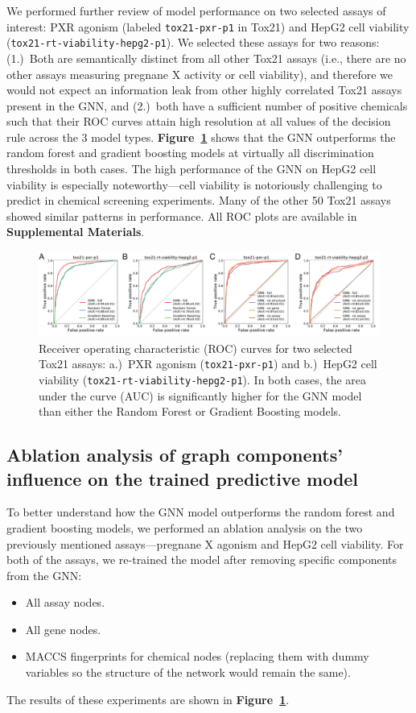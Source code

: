 \documentclass{ws-procs11x85}
\begin{document}
We performed further review of model performance on two selected assays of interest: PXR agonism (labeled \texttt{tox21-pxr-p1} in Tox21) and HepG2 cell viability (\texttt{tox21-rt-viability-hepg2-p1}).
We selected these assays for two reasons: (1.)~Both are semantically distinct from all other Tox21 assays (i.e., there are no other assays measuring pregnane X activity or cell viability), and therefore we would not expect an information leak from other highly correlated Tox21 assays present in the GNN, and (2.)~both have a sufficient number of positive chemicals such that their ROC curves attain high resolution at all values of the decision rule across the 3 model types.
\textbf{Figure~\ref{fig:4}} shows that the GNN outperforms the random forest and gradient boosting models at virtually all discrimination thresholds in both cases. 
The high performance of the GNN on HepG2 cell viability is especially noteworthy---cell viability is notoriously challenging to predict in chemical screening experiments.
Many of the other 50 Tox21 assays showed similar patterns in performance.
All ROC plots are available in \textbf{Supplemental Materials}.

\begin{figure}
   \centering
   \includegraphics[width=\textwidth]{figures/figure3.pdf}
   \caption{Receiver operating characteristic (ROC) curves for two selected Tox21 assays: a.)~PXR agonism (\texttt{tox21-pxr-p1}) and b.)~HepG2 cell viability (\texttt{tox21-rt-viability-hepg2-p1}). In both cases, the area under the curve (AUC) is significantly higher for the GNN model than either the Random Forest or Gradient Boosting models.}\label{fig:4}
\end{figure}

\subsection{Ablation analysis of graph components' influence on the trained predictive model}
To better understand how the GNN model outperforms the random forest and gradient boosting models, we performed an ablation analysis on the two previously mentioned assays---pregnane X agonism and HepG2 cell viability.
For both of the assays, we re-trained the model after removing specific components from the GNN:
\begin{itemize}
   \item All assay nodes.
   \item All gene nodes.
   \item MACCS fingerprints for chemical nodes (replacing them with dummy variables so the structure of the network would remain the same).
\end{itemize}
The results of these experiments are shown in \textbf{Figure~\ref{fig:4}}.
\end{document}
